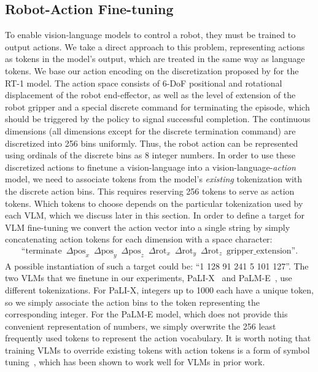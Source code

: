 \documentclass[11pt, a4paper, logo, copyright]{deepmind}
\begin{document}
\subsection{Robot-Action Fine-tuning}
\label{sec:action_ft}

To enable vision-language models to control a robot, they must be trained to output actions. We take a direct approach to this problem, representing actions as tokens in the model's output, which are treated in the same way as language tokens. We base our action encoding on the discretization proposed by \citet{brohan2022rt} for the RT-1 model. The action space consists of 6-DoF positional and rotational displacement of the robot end-effector, as well as the level of extension of the robot gripper and a special discrete command for terminating the episode, which should be triggered by the policy to signal successful completion. The continuous dimensions (all dimensions except for the discrete termination command) are discretized into 256 bins uniformly. Thus, the robot action can be represented using ordinals of the discrete bins as 8 integer numbers. In order to use these discretized actions to finetune a vision-language into a vision-language-\emph{action} model, we need to associate tokens from the model's \emph{existing} tokenization with the discrete action bins. This requires reserving 256 tokens to serve as action tokens. Which tokens to choose depends on the particular tokenization used by each VLM, which we discuss later in this section. In order to define a target for VLM fine-tuning we convert the action vector into a single string by simply concatenating action tokens for each dimension with a space character:
\begin{align*}
    \text{``terminate} \enspace \Delta \text{pos}_x \enspace \Delta \text{pos}_y \enspace \Delta \text{pos}_z \enspace \Delta \text{rot}_x \enspace \Delta \text{rot}_y \enspace \Delta \text{rot}_z \enspace \text{gripper\_extension''}.
\end{align*}
A possible instantiation of such a target could be: ``1 128 91 241 5 101 127''. The two VLMs that we finetune in our experiments, PaLI-X~\citep{chen2023palix} and PaLM-E~\citep{driess2023palm}, use different tokenizations. For PaLI-X, integers up to 1000 each have a unique token, so we simply associate the action bins to the token representing the corresponding integer. For the PaLM-E model, which does not provide this convenient representation of numbers, we simply overwrite the 256 least frequently used tokens to represent the action vocabulary.
It is worth noting that training VLMs to override existing tokens with action tokens is a form of symbol tuning~\citep{wei2023symbol}, which has been shown to work well for VLMs in prior work.
\end{document}
